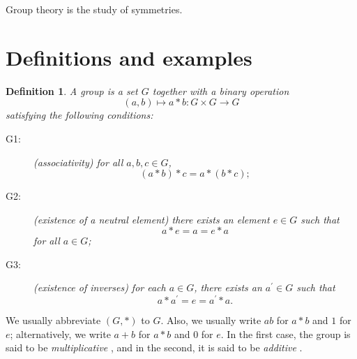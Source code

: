 \documentclass[a4paper,11pt,final]{memoir}%
\newtheorem{definition}[X]{Definition}
\theoremstyle{nonumberplain}
\begin{document}
Group theory is the study of symmetries.

\section{Definitions and examples}

\begin{definition}
\label{bd1} A \emph{group}%
is a set $G$ together with a binary operation
\[
(a,b)\mapsto a\ast b\colon G\times G\rightarrow G
\]
satisfying the following conditions:

\begin{description}
\item[G1:] (associativity) for all $a,b,c\in G$,
\[
(a\ast b)\ast c=a\ast(b\ast c);
\]


\item[G2:] (existence of a neutral element) there exists an element $e\in G$
such that
\begin{equation}
a\ast e=a=e\ast a \label{e14}%
\end{equation}
for all $a\in G$;

\item[G3:] (existence of inverses) for each $a\in G$, there exists an
$a^{\prime}\in G$ such that
\[
a\ast a^{\prime}=e=a^{\prime}\ast a.
\]

\end{description}
\end{definition}

\noindent We usually abbreviate $(G,\ast)$ to $G$. Also, we usually write $ab$
for $a\ast b$ and $1$ for $e$; alternatively, we write $a+b$ for $a\ast b$ and
0 for $e$. In the first case, the group is said to be \emph{multiplicative}%
%
, and in the second, it is said to be \emph{additive}%
%
.
\end{document}
